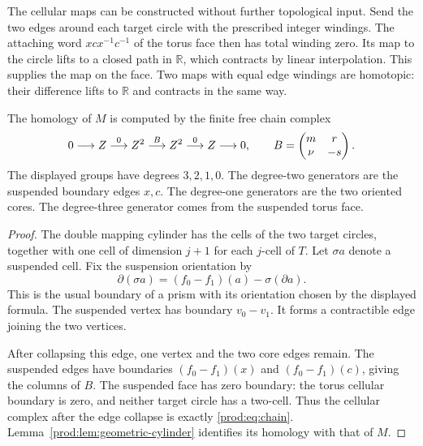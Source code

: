 The cellular maps can be constructed without further topological input.
Send the two edges around each target circle with the prescribed integer
windings.  The attaching word $xcx^{-1}c^{-1}$ of the torus face then
has total winding zero.  Its map to the circle lifts to a closed path
in $\mathbb R$, which contracts by linear interpolation.
This supplies the map on the face.
Two maps with equal edge windings are homotopic: their difference lifts
to $\mathbb R$ and contracts in the same way.

\begin{theorem}\label{prod:thm:chains}
The homology of $M$ is computed by the finite free chain complex
\begin{equation}\label{prod:eq:chain}
 0\longrightarrow Z\mathrel{\mathop{\longrightarrow}^{0}}
 Z^2\mathrel{\mathop{\longrightarrow}^{B}}Z^2
 \mathrel{\mathop{\longrightarrow}^{0}}Z\longrightarrow0,
 \qquad
 B=\begin{pmatrix}m&r\\ \nu&-s\end{pmatrix}.
\end{equation}
The displayed groups have degrees $3,2,1,0$.
The degree-two generators are the suspended boundary edges $x,c$.
The degree-one generators are the two oriented cores.
The degree-three generator comes from the suspended torus face.
\end{theorem}

\begin{proof}
The double mapping cylinder has the cells of the two target circles,
together with one cell of dimension $j+1$ for each $j$-cell of $T$.
Let $\sigma a$ denote a suspended cell.  Fix the suspension orientation by
\[
       \partial(\sigma a)=(f_0-f_1)(a)-\sigma(\partial a).
\]
This is the usual boundary of a prism with its orientation chosen by
the displayed formula.  The suspended vertex has boundary
$v_0-v_1$.  It forms a contractible edge joining the two vertices.

After collapsing this edge, one vertex and the two core edges remain.
The suspended edges have boundaries $(f_0-f_1)(x)$ and
$(f_0-f_1)(c)$, giving the columns of $B$.
The suspended face has zero boundary: the torus cellular boundary
is zero, and neither target circle has a two-cell.
Thus the cellular complex after the edge collapse is exactly
\eqref{prod:eq:chain}.  Lemma~\ref{prod:lem:geometric-cylinder} identifies its
homology with that of $M$.
\end{proof}

